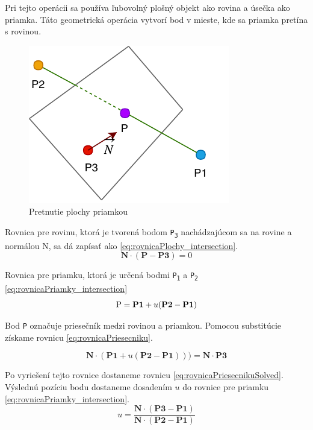 Pri tejto operácii sa používa ľubovolný plošný objekt ako rovina a úsečka ako priamka. Táto geometrická operácia vytvorí bod v mieste, kde sa priamka pretína s rovinou. 


\begin{figure}[H]
	\centering
	\includegraphics[height=0.3\textwidth]{obrazky-figures/DP Navrh operacii-Intersection.pdf}
	\caption{Pretnutie plochy priamkou}
	\label{fig:1}
\end{figure}


Rovnica pre rovinu, ktorá je tvorená bodom \texttt{P\textsubscript{3}} nachádzajúcom sa na rovine a normálou N, sa dá zapísať ako \ref{eq:rovnicaPlochy_intersection}. 
\begin{equation}
    \textbf{N} \cdot (\textbf{P} - \textbf{P3}) = 0
	\label{eq:rovnicaPlochy_intersection}
\end{equation}

Rovnica pre priamku, ktorá je určená bodmi \texttt{P\textsubscript{1}} a \texttt{P\textsubscript{2}}
\ref{eq:rovnicaPriamky_intersection}
\begin{equation}
	\textup{P}=\textbf{P1}+u (\textbf{P2}-\textbf{P1})
    \label{eq:rovnicaPriamky_intersection}
\end{equation}
	
Bod \texttt{P} označuje priesečník medzi rovinou a priamkou. Pomocou substitúcie získame rovnicu \ref{eq:rovnicaPriesecniku}.

\begin{equation}
	\textbf{N} \cdot (\textbf{P1}+u(\textbf{P2}-\textbf{P1}))) = \textbf{N} \cdot \textbf{P3}
    \label{eq:rovnicaPriesecniku}
\end{equation}

Po vyriešení tejto rovnice dostaneme rovnicu \ref{eq:rovnicaPriesecnikuSolved}. Výslednú pozíciu bodu dostaneme dosadením $u$ do rovnice pre  priamku \ref{eq:rovnicaPriamky_intersection}.
\begin{equation}
	u=\frac
{\textbf{N} \cdot (\textbf{P3}-\textbf{P1})}
{\textbf{N} \cdot (\textbf{P2}-\textbf{P1})}
    \label{eq:rovnicaPriesecnikuSolved}
\end{equation}


